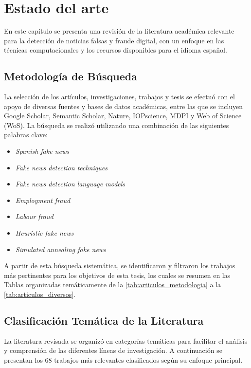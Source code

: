 \chapter{Estado del arte \label{cap:EstadoDelArte}}

En este capítulo se presenta una revisión de la literatura académica relevante para la detección de noticias falsas y fraude digital, con un enfoque en las técnicas computacionales y los recursos disponibles para el idioma español.

\section{Metodología de Búsqueda}
\label{sec:busqueda_literatura}

La selección de los artículos, investigaciones, trabajos y tesis se efectuó con el apoyo de diversas fuentes y bases de datos académicas, entre las que se incluyen Google Scholar, Semantic Scholar, Nature, IOPscience, MDPI y Web of Science (WoS). La búsqueda se realizó utilizando una combinación de las siguientes palabras clave:

\begin{itemize}
    \item \textit{Spanish fake news}
    \item \textit{Fake news detection techniques}
    \item \textit{Fake news detection language models}
    \item \textit{Employment fraud}
    \item \textit{Labour fraud}
    \item \textit{Heuristic fake news}
    \item \textit{Simulated annealing fake news}
\end{itemize}

A partir de esta búsqueda sistemática, se identificaron y filtraron los trabajos más pertinentes para los objetivos de esta tesis, los cuales se resumen en las Tablas organizadas temáticamente de la \ref{tab:articulos_metodologia} a la \ref{tab:articulos_diversos}.

\section{Clasificación Temática de la Literatura}
\label{sec:clasificacion_tematica}

La literatura revisada se organizó en categorías temáticas para facilitar el análisis y comprensión de las diferentes líneas de investigación. A continuación se presentan los 68 trabajos más relevantes clasificados según su enfoque principal.

